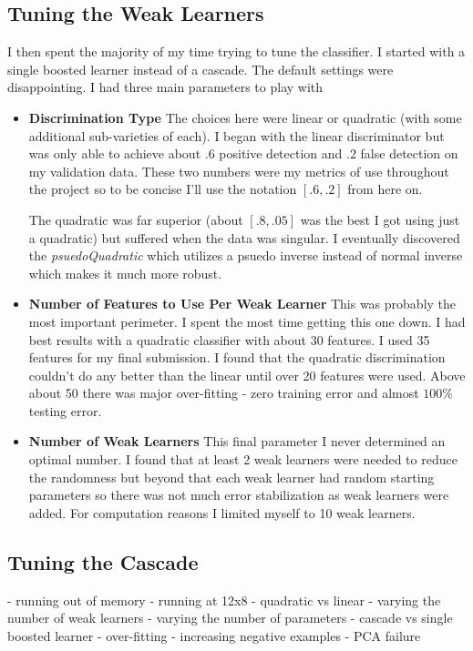 \documentclass[letterpaper,12pt]{article}
\begin{document}
\subsection{Tuning the Weak Learners}
I then spent the majority of my time trying to tune the classifier. I started with a single boosted learner instead of a cascade. The default settings were disappointing. I had three main parameters to play with

\begin{itemize}
\item
\textbf{Discrimination Type}
The choices here were linear or quadratic (with some additional sub-varieties of each). I began with the linear discriminator but was only able to achieve about $.6$ positive detection and $.2$ false detection on my validation data. These two numbers were my metrics of use
throughout the project so to be concise I'll use the notation $[.6,.2]$ from here on.

The quadratic was far superior (about $[.8,.05]$ was the best I got using just a quadratic) but suffered when the data was singular. I eventually discovered the \textit{psuedoQuadratic} which utilizes a psuedo inverse instead of normal inverse which makes it much more robust.

\item
\textbf{Number of Features to Use Per Weak Learner}
This was probably the most important perimeter. I spent the most time getting this one down. I had best results with a quadratic classifier with about 30 features. I used 35 features for my final submission. I found that the quadratic discrimination couldn't do any better than the linear until over 20 features were used. Above about 50 there was major over-fitting - zero training error and almost $100\%$ testing error.

\item
\textbf{Number of Weak Learners}
This final parameter I never determined an optimal number. I found that at least 2 weak learners were needed to reduce the randomness but beyond that each weak learner had random starting parameters so there was not much error stabilization as weak learners were added. For computation reasons I limited myself to 10 weak learners.

\end{itemize}

\subsection{Tuning the Cascade}

- running out of memory - running at 12x8
- quadratic vs linear
- varying the number of weak learners
- varying the number of parameters
- cascade vs single boosted learner
- over-fitting
- increasing negative examples
- PCA failure
\end{document}
